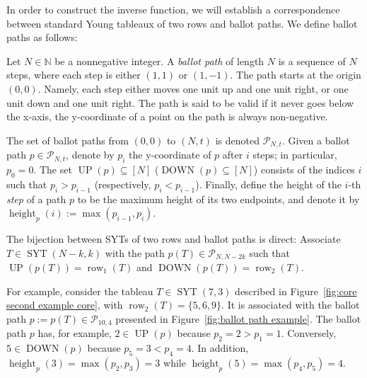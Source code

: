 \documentclass[ALCO]{cedram}
\newcommand{\Syt}{\operatorname{SYT}}
\newcommand{\height}{\operatorname{height}}
\newcommand{\row}{\operatorname{row}}
\newcommand{\UP}{\operatorname{UP}}
\newcommand{\DOWN}{\operatorname{DOWN}}
\newcommand{\NN}{\mathbb{N}}
\newcommand{\Pcal}{\mathcal{P}}
\begin{document}
In order to construct the inverse function, we will establish a correspondence between standard Young tableaux of two rows and ballot paths. We define ballot paths as follows:
\begin{definition}
\label{def:ballot path}
    Let $N \in \NN$ be a nonnegative integer. A \emph{ballot path} of length $N$ is a sequence of $N$ steps, where each step is either $(1,1)$ or $(1,-1)$. The path starts at the origin $(0,0)$. Namely, each step either moves one unit up and one unit right, or one unit down and one unit right. The path is said to be valid if it never goes below the x-axis, \ie the y-coordinate of a point on the path is always non-negative.

    The set of ballot paths from $(0,0)$ to $(N,t)$ is denoted $\Pcal_{N,t}$. Given a ballot path $p \in \Pcal_{N,t}$, denote by $p_i$ the y-coordinate of $p$ after $i$ steps; in particular, $p_0=0$. The set $\UP(p) \subseteq [N]$ ($\DOWN(p) \subseteq [N]$) consists of the indices $i$ such that $p_i > p_{i-1}$ (respectively, $p_i < p_{i-1}$). Finally, define the height of the $i$-th \emph{step} of a path $p$ to be the maximum height of its two endpoints, and denote it by $\height_p(i) := \max(p_{i-1},p_i)$.
\end{definition}

The bijection between SYTs of two rows and ballot paths is direct: Associate $T \in \Syt(N-k,k)$ with the path $p(T) \in \Pcal_{N,N-2k}$ such that $\UP(p(T)) = \row_1(T)$ and $\DOWN(p(T)) = \row_2(T)$.

For example, consider the tableau $T \in \Syt(7,3)$ described in Figure~\ref{fig:core second example core}, with $\row_2(T) = \{5,6,9\}$. It is associated with the ballot path $p := p(T) \in \Pcal_{10,4}$ presented in Figure~\ref{fig:ballot path example}. The ballot path $p$ has, for example, $2 \in \UP(p)$ because $p_2 = 2 > p_1 = 1$. Conversely, $5 \in \DOWN(p)$ because $p_5 = 3 < p_4 = 4$. In addition, $\height_p(3) = \max(p_2,p_3) = 3$ while $\height_p(5) = \max(p_4,p_5) = 4$.
\end{document}
